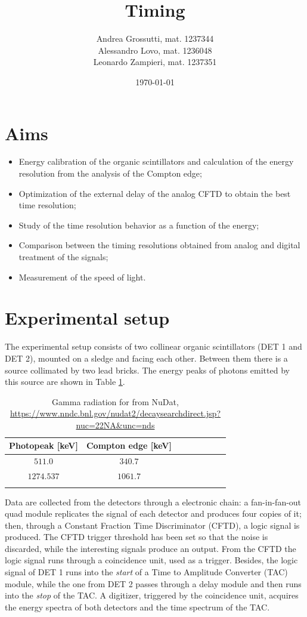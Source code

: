 \documentclass[11pt,a4 paper]{article}
\title{Timing}
\author{Andrea Grossutti, mat. 1237344\\Alessandro Lovo, mat. 1236048\\Leonardo Zampieri, mat. 1237351}
\date{\today}
\begin{document}
\maketitle

\section{Aims}
\begin{itemize}[noitemsep]
    \item Energy calibration of the organic scintillators and calculation of the energy resolution from the analysis of the Compton edge;
    \item Optimization of the external delay of the analog CFTD to obtain the best time resolution;
    \item Study of the time resolution behavior as a function of the energy;
    \item Comparison between the timing resolutions obtained from analog and digital treatment of the signals;
    \item Measurement of the speed of light.
\end{itemize}

\section{Experimental setup}
The experimental setup consists of two collinear organic scintillators (DET 1 and DET 2), mounted on a sledge and facing each other. Between them there is a  source collimated by two lead bricks. The energy peaks of photons emitted by this source are shown in Table \ref{tab:gammavalue}.

\begin{table}[H]
    \centering
    \begin{tabular}{cccccccc}
        \toprule
        Photopeak [keV] & Compton edge [keV] \\
        \midrule
        $511.0$ & $340.7$\\
        $1274.537$ & $1061.7$ \\
        \bottomrule\vspace{0.01cm}
    \end{tabular}
    \caption{Gamma radiation for  from NuDat, \url{https://www.nndc.bnl.gov/nudat2/decaysearchdirect.jsp?nuc=22NA\&unc=nds}}
    \label{tab:gammavalue}
\end{table}

Data are collected from the detectors through a electronic chain: a fan-in-fan-out quad module replicates the signal of each detector and produces four copies of it; then, through a Constant Fraction Time Discriminator (CFTD), a logic signal is produced. The CFTD trigger threshold has been set so that the noise is discarded, while the interesting signals produce an output. From the CFTD the logic signal runs through a coincidence unit, used as a trigger. Besides, the logic signal of DET 1 runs into the \emph{start} of a Time to Amplitude Converter (TAC) module, while the one from DET 2 passes through a delay module and then runs into the \emph{stop} of the TAC. A digitizer, triggered by the coincidence unit, acquires the energy spectra of both detectors and the time spectrum of the TAC.
\end{document}
